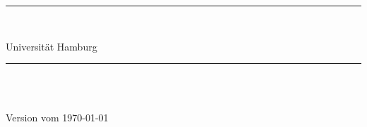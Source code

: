 

\setlength{\abovedisplayskip}{3pt}
\setlength{\belowdisplayskip}{3pt}
\setlength{\abovedisplayshortskip}{3pt}
\setlength{\belowdisplayshortskip}{3pt}

	\thispagestyle{empty}
	\rule{\linewidth}{1pt}
	
	\vspace{6pt}				%
	
	\begin{minipage}{0.6\textwidth}
		\begin{flushleft} 
		\Autor\\
		\Profs
		\end{flushleft}
	\end{minipage}
	\begin{minipage}{0.39\textwidth}
		\begin{flushright}
			Universität Hamburg
		\end{flushright}
	\end{minipage}

	\rule{\linewidth}{1pt}\\
	\begin{center}
		\Large{\textsf{\titel}}\\
		\small\textsf{Version vom \today}
\vspace{8pt}
\end{center}


